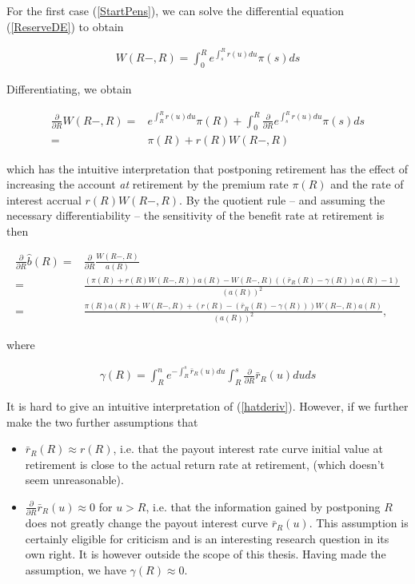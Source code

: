 \documentclass{book}
\newcommand{\1}[1]{\mathbbm{1}_{\left\lbrace #1 \right\rbrace}}
\theoremstyle{break}
\theoremstyle{remark}
\numberwithin{equation}{section}
\begin{document}
For the first case (\ref{StartPens}), we can solve the differential equation (\ref{ReserveDE}) to obtain

\begin{align} \label{ReserveAtRetirement}
	W(R-,R) = \int_0^R e^{\int_s^R r(u) du} \pi(s) ds
\end{align}

Differentiating, we obtain

\begin{align*}
	\frac{\partial}{\partial R} W(R-,R) =& e^{\int_R^R r(u) du} \pi(R) + \int_0^R \frac{\partial}{\partial R} e^{\int_s^R r(u) du} \pi(s) ds \\
	=& \pi(R) + r(R) W(R-,R)
\end{align*}

which has the intuitive interpretation that postponing retirement has the effect of increasing the account \textit{at} retirement by the premium rate $\pi(R)$ and the rate of interest accrual $r(R) W(R-,R)$. By the quotient rule -- and assuming the necessary differentiability -- the sensitivity of the benefit rate at retirement is then

\begin{align} \label{hatderiv}
	\frac{\partial}{\partial R} \hat{b}(R) =& \frac{\partial}{\partial R} \frac{W(R-,R)}{a(R)} \nonumber \\
	=& \frac{\left( \pi(R) + r(R) W(R-,R) \right) a(R) - W(R-,R) \left( \left( \bar{r}_R(R) - \gamma(R) \right) a(R) - 1 \right)}{\left( a(R) \right)^2} \nonumber \\
	=& \frac{\pi(R) a(R)  + W(R-,R) + \left( r(R) - \left( \bar{r}_R(R) - \gamma(R) \right) \right) W(R-,R) a(R)}{\left( a(R) \right)^2},
\end{align}

where

\begin{align*}
	\gamma(R) = \int_R^n e^{-\int_R^s \bar{r}_R(u) du} \int_R^s 	\frac{\partial}{\partial R} \bar{r}_R(u) du ds
\end{align*}

It is hard to give an intuitive interpretation of (\ref{hatderiv}). However, if we further make the two further assumptions that

\begin{itemize}
	\item $\bar{r}_R (R) \approx r (R)$, i.e. that the payout interest rate curve initial value at retirement is close to the actual return rate at retirement, (which doesn't seem unreasonable).
	\item $\frac{\partial}{\partial R} \bar{r}_R(u) \approx 0$ for $u > R$, i.e. that the information gained by postponing $R$ does not greatly change the payout interest curve $\bar{r}_R(u)$. This assumption is certainly eligible for criticism and is an interesting research question in its own right. It is however outside the scope of this thesis. Having made the assumption, we have $\gamma(R) \approx 0$.
\end{itemize}
\end{document}
